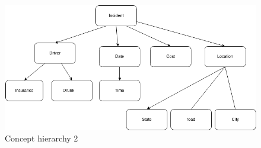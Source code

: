 	\begin{figure}[H]
		\centering
		\includegraphics[scale=0.5]{pics/Concept2.png}
		\caption{Concept hierarchy 2}
	\end{figure}